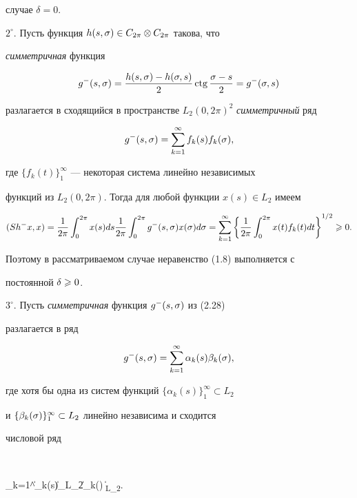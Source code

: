 случае $\delta=0$.





$2^\circ$. Пусть функция $h(s,\sigma)\in C_{2\pi}\otimes C_{2\pi}$ такова, что


{\it симметричная} функция


$$


g^{-}(s,\si) = \frac{h(s,\si)-h(\si,s)}{2}\ctg\frac{\si-s}{2} =


g^{-}(\si,s)


$$


разлагается в сходящийся в пространстве $L_2(0,2\pi)^2$ {\it симметричный} ряд


$$


g^-(s,\si) = \suml_{k=1}^\infty f_k(s)f_k(\si),


$$


где $\{f_k(t)\}_1^\infty$ --- некоторая система линейно независимых


функций из $L_2(0,2\pi)$. Тогда для любой функции $x(s)\in L_2$ имеем


$$


(Sh^-x,x) = \frac{1}{2\pi}\int_{0}^{2\pi}x(s)ds


\frac{1}{2\pi}\int_{0}^{2\pi}g^-(s,\si)x(\si)d\si =


\suml_{k=1}^\infty\left\{\frac{1}{2\pi}\int_{0}^{2\pi}x(t)f_k(t)dt


\right\}^{1/2}\gea 0.


$$


Поэтому в рассматриваемом случае неравенство (1.8) выполняется с


постоянной $\delta\geqslant 0$.





$3^\circ$. Пусть {\it симметричная} функция $g^-(s,\sigma)$ из (2.28)


разлагается в ряд


$$


g^{-}(s,\si) = \suml_{k=1}^\infty \alpha_k(s)\beta_k(\si),


$$


где хотя бы одна из систем функций $\{\alpha_k(s)\}_1^\infty \subset L_2$


и $\{\beta_k(\sigma)\}_1^\infty\subset L_2$ линейно независима и сходится


числовой ряд


$$


\suml_{k=1}^{\infty}\|\alpha_k(s)\|_{L_2}\|\beta_k(\si)\|_{L_2}.


